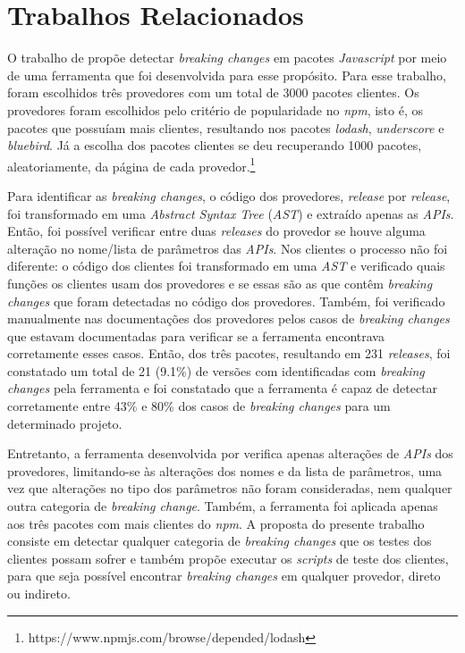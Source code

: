\section{Trabalhos Relacionados}
\label{sec:related_works}

O trabalho de  propõe detectar \textit{breaking changes} em pacotes \textit{Javascript} por meio de uma ferramenta que foi desenvolvida para esse propósito. Para esse trabalho, foram escolhidos três provedores com um total de 3000 pacotes clientes. Os provedores foram escolhidos pelo critério de popularidade no \textit{npm}, isto é, os pacotes que possuíam mais clientes, resultando nos pacotes \textit{lodash}, \textit{underscore} e \textit{bluebird}. Já a escolha dos pacotes clientes se deu recuperando 1000 pacotes, aleatoriamente, da página de cada provedor.\footnote{https://www.npmjs.com/browse/depended/lodash}

Para identificar as \textit{breaking changes}, o código dos provedores, \textit{release} por \textit{release}, foi transformado em uma \textit{Abstract Syntax Tree} (\textit{AST}) e extraído apenas as \textit{APIs}. Então, foi possível verificar entre duas \textit{releases} do provedor se houve alguma alteração no nome/lista de parâmetros das \textit{APIs}. Nos clientes o processo não foi diferente: o código dos clientes foi transformado em uma \textit{AST} e verificado quais funções os clientes usam dos provedores e se essas são as que contêm \textit{breaking changes} que foram detectadas no código dos provedores. Também, foi verificado manualmente nas documentações dos provedores pelos casos de \textit{breaking changes} que estavam documentadas para verificar se a ferramenta encontrava corretamente esses casos. Então, dos três pacotes, resultando em 231 \textit{releases}, foi constatado um total de 21 (9.1\%) de versões com identificadas com \textit{breaking changes} pela ferramenta e foi constatado que a ferramenta é capaz de detectar corretamente entre 43\% e 80\% dos casos de \textit{breaking changes} para um determinado projeto.

Entretanto, a ferramenta desenvolvida por  verifica apenas alterações de \textit{APIs} dos provedores, limitando-se às alterações dos nomes e da lista de parâmetros, uma vez que alterações no tipo dos parâmetros não foram consideradas, nem qualquer outra categoria de \textit{breaking change}. Também, a ferramenta foi aplicada apenas aos três pacotes com mais clientes do \textit{npm}. A proposta do presente trabalho consiste em detectar qualquer categoria de \textit{breaking changes} que os testes dos clientes possam sofrer e também propõe executar os \textit{scripts} de teste dos clientes, para que seja possível encontrar \textit{breaking changes} em qualquer provedor, direto ou indireto.

